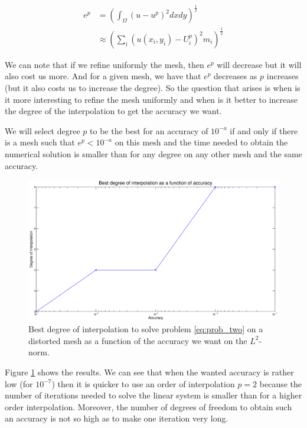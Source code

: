 \begin{align}
e^p &= \left( \int_\Omega (u-u^p)^2dxdy \right)^\frac{1}{2}\\
 &\approx \left( \sum_i (u(x_i,y_i)-U_i^p)^2 m_i \right)^\frac{1}{2}
\end{align}

We can note that if we refine uniformly the mesh, then $e^p$ will decrease but it will also cost us more. And for a given mesh, we have that $e^p$ decreases as $p$ increases (but it also costs us to increase the degree). So the question that arises is when is it more interesting to refine the mesh uniformly and when is it better to increase the degree of the interpolation to get the accuracy we want.

We will select degree $p$ to be the best for an accuracy of $10^{-a}$ if and only if there is a mesh such that $e^p<10^{-a}$ on this mesh and the time needed to obtain the numerical solution is smaller than for any degree on any other mesh and the same accuracy. 

\begin{figure}
\centering
\includegraphics[scale=0.35]{Results/two_acc.eps}
\caption{Best degree of interpolation to solve problem \ref{eq:prob_two} on a distorted mesh as a function of the accuracy we want on the $L^2$-norm.}
\label{two_acc}
\end{figure}

Figure \ref{two_acc} shows the results. We can see that when the wanted accuracy is rather low (for $10^{-7}$) then it is quicker to use an order of interpolation $p=2$ because the number of iterations needed to solve the linear system is smaller than for a higher order interpolation. Moreover, the number of degrees of freedom to obtain such an accuracy is not so high as to make one iteration very long. 


